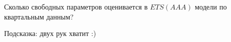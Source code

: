 
\begin{question}
Сколько свободных параметров оценивается в \(ETS(AAA)\) модели по квартальным данным?
\end{question}

\begin{solution}
Подсказка: двух рук хватит :)
\end{solution}


